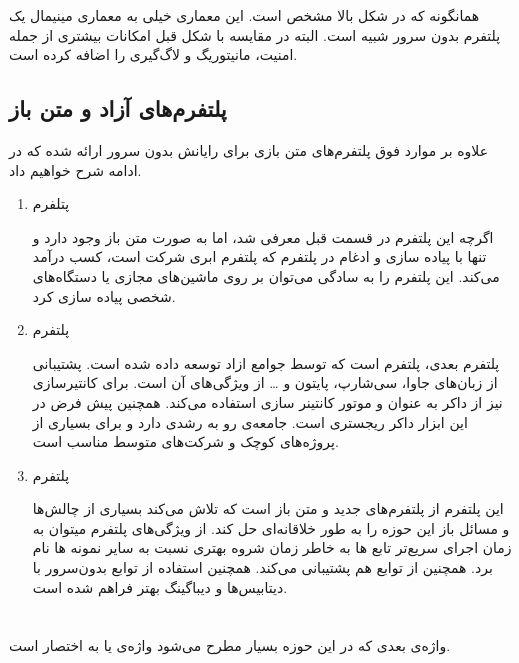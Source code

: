 همانگونه که در شکل بالا مشخص است. این معماری خیلی به معماری مینیمال یک پلتفرم بدون سرور شبیه است. البته در مقایسه با شکل قبل امکانات بیشتری از جمله امنیت، مانیتوریگ و لاگ‌گیری را اضافه کرده است. 

\subsection{پلتفرم‌های آزاد و متن باز}
علاوه بر موارد فوق پلتفرم‌های متن بازی برای رایانش بدون سرور ارائه شده که در ادامه شرح خواهیم داد. 

\begin{enumerate}
	
	\item پتلفرم 
	
	اگرچه این پلتفرم در قسمت قبل معرفی شد، اما به صورت متن باز وجود دارد و تنها  با پیاده سازی و ادغام در پلتفرم  که پلتفرم ابری شرکت  است، کسب درآمد می‌کند.  این پلتفرم را به سادگی می‌توان بر روی ماشین‌های مجازی یا دستگاه‌های شخصی پیاده سازی کرد. 
	
	\item پلتفرم  
	
	پلتفرم بعدی، پلتفرم  است که توسط جوامع ازاد توسعه داده شده است. پشتیبانی از زبان‌های جاوا، سی‌شارپ، پایتون و … از ویژگی‌های آن است. برای کانتیرسازی نیز از داکر به عنوان  و موتور کانتینر سازی استفاده می‌کند. همچنین  پیش فرض در این ابزار داکر ریجستری است. جامعه‌ی رو به رشدی دارد و برای بسیاری از پروژه‌های کوچک و شرکت‌های متوسط مناسب است.
	
	\item پلتفرم ‌
	
	این پلتفرم از پلتفرم‌های جدید و متن باز است که تلاش می‌کند بسیاری از چالش‌ها و مسائل باز این حوزه را به طور خلاقانه‌ای حل کند. از ویژگی‌های پلتفرم  میتوان به زمان اجرای سریع‌تر تابع ها به خاطر زمان شروه بهتری نسبت به سایر نمونه ها نام برد. همچنین از توابع  هم پشتیبانی می‌کند. همچنین استفاده از توابع بدون‌سرور با دیتابیس‌ها و دیباگینگ بهتر فراهم شده است. \cite{hendrickson2016serverless}
	
\end{enumerate}

\section{}

واژه‌ی بعدی که در این حوزه بسیار مطرح می‌شود واژه‌ی  یا به اختصار  است. 

